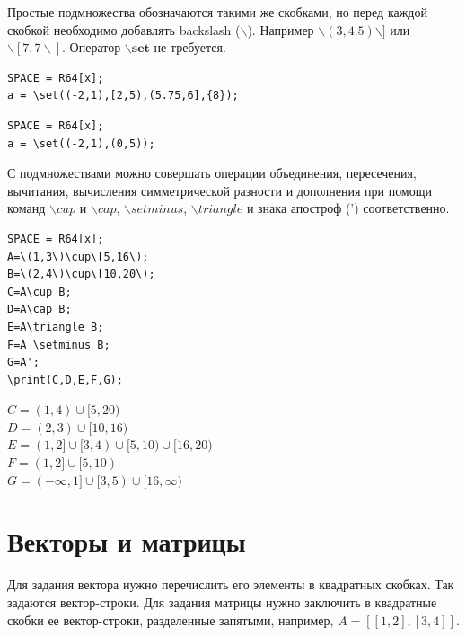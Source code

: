 Простые подмножества обозначаются такими же скобками, но перед каждой скобкой необходимо добавлять backslash ($\backslash$). 
Например $\backslash (3,4.5)\backslash ]$ или   $\backslash[7,7\backslash]$.
Оператор $\backslash {\mathbf {set}}$ не требуется.
\begin{verbatim}
SPACE = R64[x];
a = \set((-2,1),[2,5),(5.75,6],{8});
\end{verbatim}


 
\begin{verbatim}
SPACE = R64[x];
a = \set((-2,1),(0,5));
\end{verbatim}


С подмножествами можно совершать операции объединения, пересечения, вычитания, вычисления симметрической разности и дополнения
 при помощи команд $\backslash cup$ и $\backslash cap$, $\backslash setminus$, $\backslash triangle$ и знака апостроф (') соответственно.

\begin{verbatim}
SPACE = R64[x];
A=\(1,3\)\cup\[5,16\);
B=\(2,4\)\cup\[10,20\);
C=A\cup B;
D=A\cap B;
E=A\triangle B;
F=A \setminus B;
G=A';
\print(C,D,E,F,G);
\end{verbatim}

\ex{ $SPACE=R64[x]; $\\
$ A=(1,3)\cup[5,16);$\\
$B=(2,4)\cup[10,20);$\\
$C=A\cup B;$\\
$D=A\cap B;$\\
$E=A\triangle B;$\\
$F=A \setminus B;$\\
$G=A';$\\
$print(C,D,E,F,G);$}
{$C = (1,4)\cup[5,20)$\\
 $D = (2,3)\cup[10,16)$\\
 $E = (1,2]\cup[3,4)\cup[5,10)\cup[16,20)$\\
 $F = (1,2]\cup[5,10)$\\
 $G = (-\infty,1]\cup[3,5)\cup[16,\infty)$}

\newpage
\section{Векторы и матрицы}
Для задания вектора нужно перечислить его элементы  в квадратных скобках.  Так задаются вектор-строки.  
Для задания матрицы нужно заключить в квадратные скобки ее вектор-строки, разделенные запятыми,  например,  $A = [[1, 2], [3, 4]]$. 

